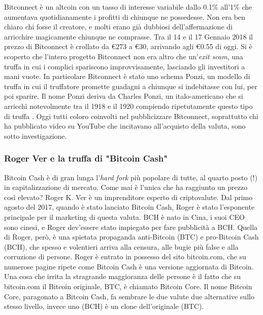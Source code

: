 \documentclass {article}
\begin{document}
Bitconnect è un altcoin con un tasso di interesse variabile dallo 0.1\% all'1\% che aumentava quotidianamente i profitti di chiunque ne possedesse.
Non era ben chiaro chi fosse il creatore, e molti erano già dubbiosi dell'affermazione di arricchire magicamente chiunque ne comprasse.
Tra il 14 e il 17 Gennaio 2018 il prezzo di Bitconnect è crollato da \euro{273} a \euro{30}, arrivando agli \euro{0.55} di oggi.
Si è scoperto che l'intero progetto Bitconnect non era altro che un'\textit{exit scam}, una truffa in cui i complici spariscono improvvisamente, lasciando gli investitori a mani vuote.
In particolare Bitconnect è stato uno schema Ponzi, un modello di truffa in cui il truffatore promette guadagni a chiunque si indebitasse con lui, per poi sparire.
Il nome Ponzi deriva da Charles Ponzi, un italo-americano che si arricchì notevolmente tra il 1918 e il 1920 compiendo ripetutamente questo tipo di truffa \cite{ponzi}.
Oggi tutti coloro coinvolti nel pubblicizzare Bitconnect, soprattutto chi ha pubblicato video su YouTube che incitavano all'acquisto della valuta, sono sotto investigazione.

\subsubsection {Roger Ver e la truffa di "Bitcoin Cash"}

Bitcoin Cash è di gran lunga l'\textit{hard fork} più popolare di tutte, al quarto posto (!) in capitalizzazione di mercato. Come mai è l'unica che ha raggiunto un prezzo così elevato?
Roger K. Ver è un imprenditore esperto di criptovalute.
Dal primo agosto del 2017, quando è stato lanciato Bitcoin Cash, Roger è stato l'esponente principale per il marketing di questa valuta. BCH è nato in Cina, i suoi CEO sono cinesi, e Roger dev'essere stato impiegato per fare pubblicità a BCH.
Quella di Roger, però, è una spietata propaganda anti-Bitcoin (BTC) e pro-Bitcoin Cash (BCH), che spesso e volentieri arriva alla censura, alle bugie più false e alla corruzione di persone.
Roger è entrato in possesso del sito bitcoin.com, che su numerose pagine ripete come Bitcoin Cash è una versione aggiornata di Bitcoin. Una cosa che irrita la stragrande maggioranza delle persone è il fatto che su bitcoin.com il Bitcoin originale, BTC, è chiamato Bitcoin Core.
Il nome Bitcoin Core, paragonato a Bitcoin Cash, fa sembrare le due valute due alternative sullo stesso livello, invece uno (BCH) è un clone dell'originale (BTC).
\end{document}
